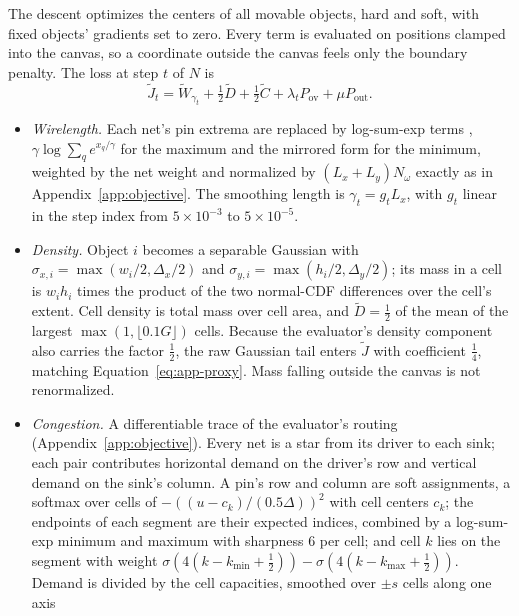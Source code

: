 The descent optimizes the centers of all movable objects, hard and soft, with
fixed objects' gradients set to zero. Every term is evaluated on positions clamped
into the canvas, so a coordinate outside the canvas feels only the boundary penalty.
The loss at step $t$ of $N$ is
\begin{equation}
  \widetilde J_t=\widetilde W_{\gamma_t}+\tfrac12\widetilde D+\tfrac12\widetilde C
  +\lambda_tP_{\mathrm{ov}}+\mu P_{\mathrm{out}}.
\end{equation}
\begin{itemize}
  \item \emph{Wirelength.} Each net's pin extrema are replaced by log-sum-exp
        terms \citep{naylor2001lse}, $\gamma\log\sum_q e^{x_q/\gamma}$ for the
        maximum and the mirrored form for the minimum, weighted by the net weight and normalized by
        $(L_x+L_y)N_\omega$ exactly as in Appendix~\ref{app:objective}. The smoothing
        length is $\gamma_t=g_tL_x$, with $g_t$ linear in the step index from
        $5\times10^{-3}$ to $5\times10^{-5}$.
  \item \emph{Density.} Object $i$ becomes a separable Gaussian with
        $\sigma_{x,i}=\max(w_i/2,\Delta_x/2)$ and
        $\sigma_{y,i}=\max(h_i/2,\Delta_y/2)$; its mass in a cell is $w_ih_i$ times the
        product of the two normal-CDF differences over the cell's extent. Cell
        density is total mass over cell area, and
        $\widetilde D=\tfrac12$ of the mean of the largest
        $\max(1,\lfloor0.1G\rfloor)$ cells. Because the evaluator's density
        component also carries the factor $\tfrac12$, the raw Gaussian tail enters
        $\widetilde J$ with coefficient $\tfrac14$, matching
        Equation~\eqref{eq:app-proxy}. Mass falling outside the canvas is not
        renormalized.
  \item \emph{Congestion.} A differentiable trace of the evaluator's routing
        (Appendix~\ref{app:objective}). Every net is a star from its driver to each
        sink; each pair contributes horizontal demand on the driver's row and
        vertical demand on the sink's column. A pin's row and column are soft
        assignments, a softmax over cells of $-((u-c_k)/(0.5\Delta))^2$ with cell
        centers $c_k$; the endpoints of each segment are their expected indices,
        combined by a log-sum-exp minimum and maximum with sharpness 6 per cell;
        and cell $k$ lies on the segment with weight
        $\sigma(4(k-k_{\min}+\tfrac12))-\sigma(4(k-k_{\max}+\tfrac12))$. Demand is
        divided by the cell capacities, smoothed over $\pm s$ cells along one axis

\end{itemize}
